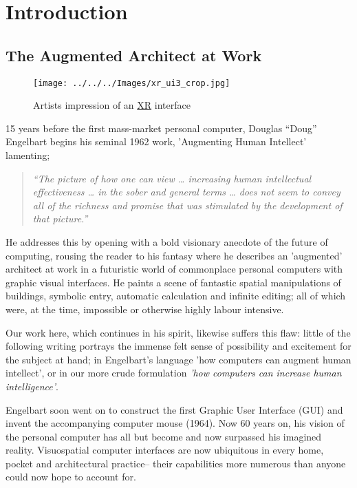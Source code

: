 \documentclass[logo,bsc,singlespacing,parskip]{infthesis}
\begin{document}
\part*{Introduction}
\label{sec:org516ca8b}
\chapter*{The Augmented Architect at Work}
\label{sec:orgbfdbdd8}
\begin{figure}[h]
\centering
\texttt{[image: ../../../Images/xr\_ui3\_crop.jpg]}
\caption{Artists impression of an \hyperref[org1d567af]{XR} interface}
\end{figure}

15 years before the first mass-market personal computer, Douglas ``Doug'' Engelbart begins his seminal 1962 work, 'Augmenting Human Intellect' \autocite{engelbartAugmentingHumanIntellect1962} lamenting;

\begin{quote}
\emph{``The picture of how one can view \ldots{} increasing human intellectual effectiveness \ldots{} in the sober and general terms \ldots{} does not seem to convey all of the richness and promise that was stimulated by the development of that picture.''}
\end{quote}

He addresses this by opening with a bold visionary anecdote of the future of computing, rousing the reader to his fantasy where he describes an 'augmented' architect at work in a futuristic world of commonplace personal computers with graphic visual interfaces.
He paints a scene of fantastic spatial manipulations of buildings, symbolic entry, automatic calculation and infinite editing; all of which were, at the time, impossible or otherwise highly labour intensive.

Our work here, which continues in his spirit, likewise suffers this flaw: little of the following writing portrays the immense felt sense of possibility and excitement for the subject at hand; in Engelbart's language 'how computers can augment human intellect', or in our more crude formulation \emph{'how computers can increase human intelligence'}.

Engelbart soon went on to construct the first Graphic User Interface (GUI) and invent the accompanying computer mouse (1964).
Now 60 years on, his vision of the personal computer has all but become and now surpassed his imagined reality.
Visuospatial computer interfaces are now ubiquitous in every home, pocket and architectural practice-- their capabilities more numerous than anyone could now hope to account for.
\end{document}
